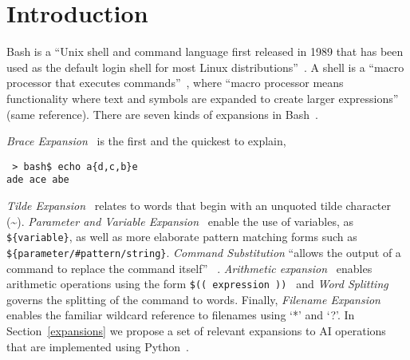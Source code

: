 \section{Introduction}\label{intro}

Bash is a \enquote{Unix shell and command language first released in 1989 that has been used as the default login shell for most Linux distributions}~. A shell is a \enquote{macro processor that executes commands}~, where \enquote{macro processor means functionality where text and symbols are expanded to create larger expressions} (same reference). There are seven kinds of expansions in Bash~.

\emph{Brace Expansion}~ is the first and the quickest to explain,
%
\begin{verbatim}
 > bash$ echo a{d,c,b}e
ade ace abe
\end{verbatim}
%
\emph{Tilde Expansion}~ relates to words that begin with an unquoted tilde character (\textasciitilde). \emph{Parameter and Variable Expansion}~ enable the use of variables, as \texttt{\$\{variable\}}, as well as more elaborate pattern matching forms such as \texttt{\$\{parameter/\#pattern/string\}}. \emph{Command Substitution} \enquote{allows the output of a command to replace the command itself} ~. \emph{Arithmetic expansion}~ enables arithmetic operations using the form \texttt{\$(( expression ))
} and \emph{Word Splitting} governs the splitting of the command to words. Finally, \emph{Filename Expansion}~ enables the familiar wildcard reference to filenames using `*' and `?'. In Section~\ref{expansions} we propose a set of relevant expansions to AI operations that are implemented using Python~.

